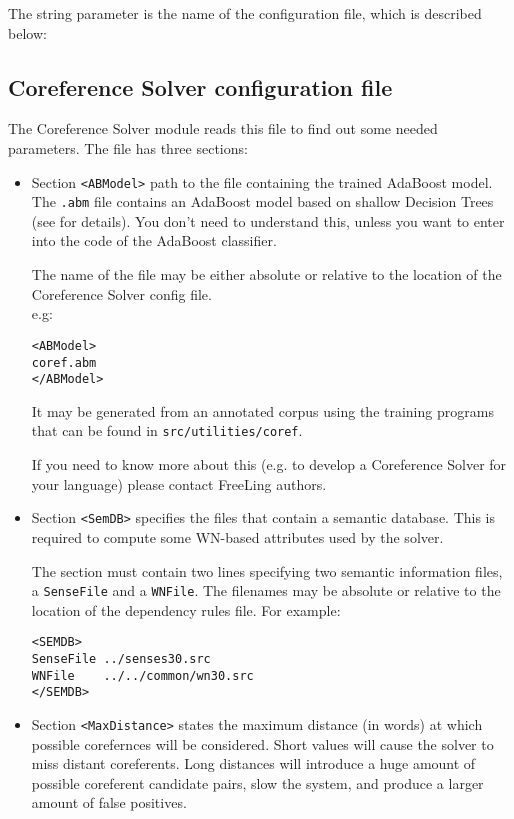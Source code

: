 \documentclass[a4paper]{book}
\begin{document}
  The string parameter is the name of the configuration file, which is described below:

\subsection{Coreference Solver configuration file}

  The Coreference Solver module reads this file to find out some needed parameters.  The file has three sections:
\begin{itemize}
   \item Section \verb#<ABModel># path to the file containing the
     trained AdaBoost model.  The {\tt .abm} file contains an AdaBoost
     model based on shallow Decision Trees (see \cite{carreras03} for
     details). You don't need to understand this, unless you want to
     enter into the code of the AdaBoost classifier.

     The name of the file may be either absolute or relative to the 
     location of the Coreference Solver config file.\\
     e.g:
\begin{verbatim}
<ABModel>
coref.abm
</ABModel>
\end{verbatim}

     It may be generated from an annotated corpus using the training
     programs that can be found in {\tt src/utilities/coref}.

     If you need to know more about this (e.g. to develop a
     Coreference Solver for your language) please contact FreeLing
     authors.

   \item Section \verb#<SemDB># specifies the files that contain a
    semantic database. This is required to compute some WN-based attributes
    used by the solver.  

    The section must contain two lines specifying two semantic
    information files, a {\tt SenseFile} and a {\tt WNFile}. The
    filenames may be absolute or relative to the location of the
    dependency rules file. For example:
\begin{verbatim}
<SEMDB>
SenseFile ../senses30.src
WNFile    ../../common/wn30.src
</SEMDB>
\end{verbatim}

   \item Section \verb#<MaxDistance># states the maximum distance (in
     words) at which possible corefernces will be considered. Short
     values will cause the solver to miss distant coreferents.
     Long distances will introduce a huge amount of possible coreferent 
     candidate pairs, slow the system, and produce a larger amount of
     false positives.
\end{itemize}
\end{document}
